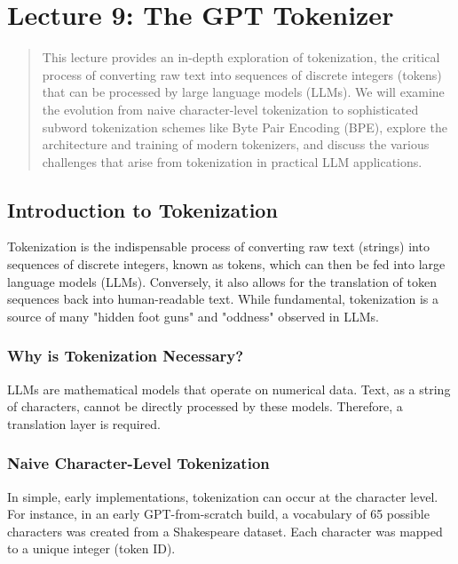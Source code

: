
\section{Lecture 9: The GPT Tokenizer}

\begin{abstract}
This lecture provides an in-depth exploration of tokenization, the critical process of converting raw text into sequences of discrete integers (tokens) that can be processed by large language models (LLMs). We will examine the evolution from naive character-level tokenization to sophisticated subword tokenization schemes like Byte Pair Encoding (BPE), explore the architecture and training of modern tokenizers, and discuss the various challenges that arise from tokenization in practical LLM applications.
\end{abstract}

\subsection{Introduction to Tokenization}

Tokenization is the indispensable process of converting raw text (strings) into sequences of discrete integers, known as tokens, which can then be fed into large language models (LLMs). Conversely, it also allows for the translation of token sequences back into human-readable text. While fundamental, tokenization is a source of many "hidden foot guns" and "oddness" observed in LLMs.

\subsubsection{Why is Tokenization Necessary?}
LLMs are mathematical models that operate on numerical data. Text, as a string of characters, cannot be directly processed by these models. Therefore, a translation layer is required.

\subsubsection{Naive Character-Level Tokenization}
In simple, early implementations, tokenization can occur at the character level. For instance, in an early GPT-from-scratch build, a vocabulary of 65 possible characters was created from a Shakespeare dataset. Each character was mapped to a unique integer (token ID).

